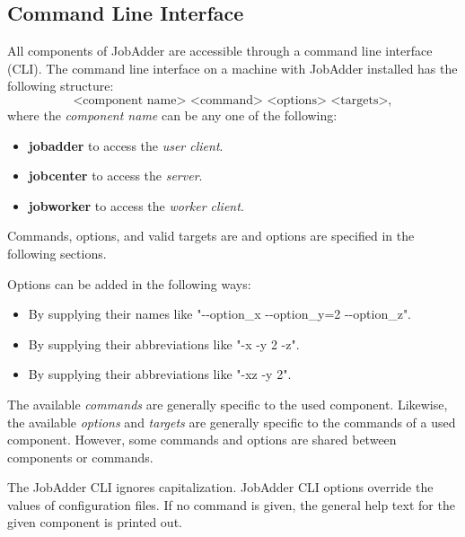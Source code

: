 \newcommand{\jacommand}[3]{

\textsc{\large{\textbf{#1}}}
\begin{itemize}
\item[\textbf{Options:}] #2
\item[\textbf{Effect:}] #3
\end{itemize}
}
\newcommand{\jaoption}[3]{
\begin{itemize}
\item[] \textbf{#1} (#2)
\item[\textbf{Effect:}] #3
\end{itemize}
}
\subsection{Command Line Interface}
All components of JobAdder are accessible through a command line interface (CLI).
The command line interface on a machine with JobAdder installed has the following structure:
\begin{equation}
\text{<component name> <command> <options> <targets>},
\end{equation}
where the \textit{component name} can be any one of the following:
\begin{itemize}
\item \textbf{jobadder} to access the \textit{user client}.
\item \textbf{jobcenter} to access the \textit{server}.
\item \textbf{jobworker} to access the \textit{worker client}.
\end{itemize}
Commands, options, and valid targets are and options are specified in the following sections.

Options can be added in the following ways:
\begin{itemize}
\item By supplying their names like "-{}-option\_x -{}-option\_y=2 -{}-option\_z".
\item By supplying their abbreviations like "-x -y 2 -z".
\item By supplying their abbreviations like "-xz -y 2".
\end{itemize}

The available \textit{commands} are generally specific to the used component.
Likewise, the available \textit{options} and \textit{targets} are generally specific to the commands of a used component.
However, some commands and options are shared between components or commands.

The JobAdder CLI ignores capitalization.
JobAdder CLI options override the values of configuration files.
If no command is given, the general help text for the given component is printed out.
